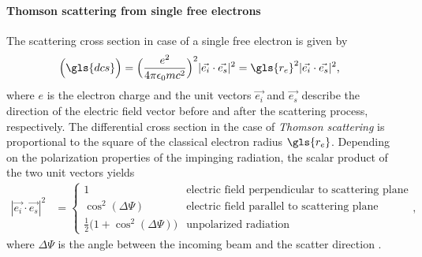 \paragraph{Thomson scattering from single free electrons}
The scattering cross section in case of a single free electron is given by
\begin{align}
 \Big(\gls{dcs}\Big) &= \Big(\frac{e^2}{4 \pi \epsilon_0 m c^2}\Big)^2 |\vec{e_i} \cdot \vec{e_s}|^2 = \gls{r_e}^2 |\vec{e_i} \cdot \vec{e_s}|^2 \text{,} \label{ch_theo:eqn_thomson_scattering}
\end{align}
where $e$ is the electron charge and the unit vectors $\vec{e_i}$ and $\vec{e_s}$ describe the direction of the electric field vector before and after the scattering process, respectively. The differential cross section in the case of \emph{Thomson scattering} is proportional to the square of the classical electron radius $\gls{r_e}$. Depending on the polarization properties of the impinging radiation, the scalar product of the two unit vectors yields
\begin{align}
|\vec{e_i} \cdot \vec{e_s}|^2 &= \begin{cases}
    1 & \text{electric field perpendicular to scattering plane} \\
    \cos^2(\Delta \Psi) & \text{electric field parallel to scattering plane} \\
    \frac{1}{2}\big(1+\cos^2(\Delta \Psi)\big) & \text{unpolarized radiation}
\end{cases} \text{,}
\end{align}
where $\Delta \Psi$ is the angle between the incoming beam and the scatter direction \cite{als-nielsen_x-rays_2011}.

